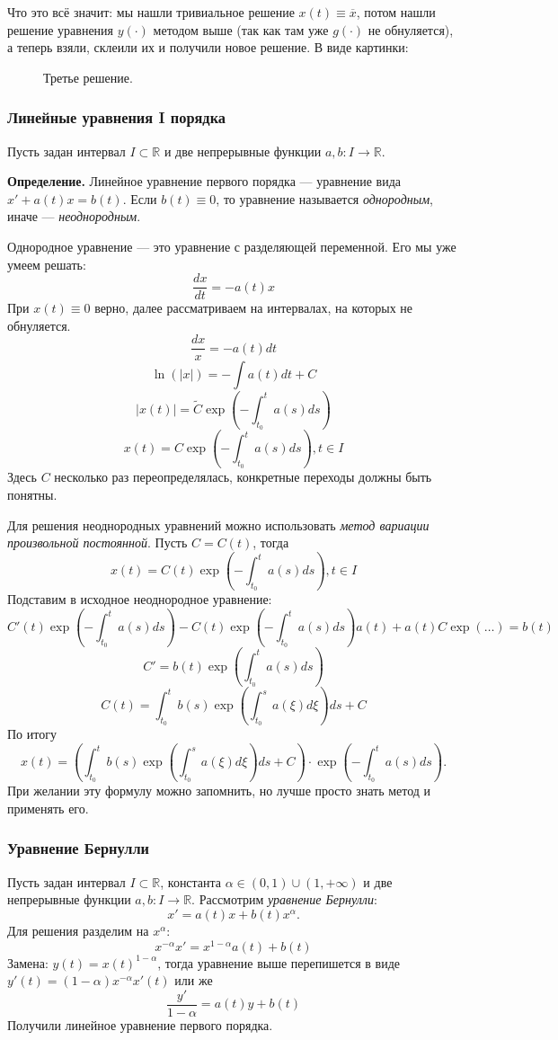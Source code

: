 Что это всё значит: мы нашли тривиальное решение $x(t) \equiv \overline x$, потом нашли решение уравнения $y(\cdot)$ методом выше (так как там уже $g(\cdot)$ не обнуляется), а теперь взяли, склеили их и получили новое решение.
В виде картинки:

\begin{figure}[ht]
    \centering
    \caption{Третье решение.}
\end{figure}

\subsubsection{Линейные уравнения I порядка}
Пусть задан интервал $I \subset \mathbb R$ и две непрерывные функции $a, b: I \to \mathbb R$.

\textbf{Определение.} Линейное уравнение первого порядка --- уравнение вида $x' + a(t)x = b(t)$.
Если $b(t) \equiv 0$, то уравнение называется \textit{однородным}, иначе --- \textit{неоднородным}.

Однородное уравнение --- это уравнение с разделяющей переменной. Его мы уже умеем решать:
\[
    \frac{dx}{dt} = -a(t)x
\]
При $x(t) \equiv 0$ верно, далее рассматриваем на интервалах, на которых не обнуляется.
\[
    \frac{dx}{x} = -a(t) dt
\]
\[
    \ln \left( |x| \right) = -\int a(t) dt + C
\]
\[
    |x(t)| = \widetilde{C} \exp \left(-\int_{t_0}^t a(s) ds \right)
\]
\[
    x(t) = C \exp \left(- \int_{t_0}^t a(s) ds \right), t \in I
\]
Здесь $C$ несколько раз переопределялась, конкретные переходы должны быть понятны.

Для решения неоднородных уравнений можно использовать \textit{метод вариации произвольной постоянной}. Пусть $C = C(t)$, тогда
\[
    x(t) = C(t) \exp \left(- \int_{t_0}^t a(s) ds \right), t \in I
\]
Подставим в исходное неоднородное уравнение:
\[
    C'(t) \exp \left(- \int_{t_0}^t a(s) ds \right) - C(t) \exp \left(- \int_{t_0}^t a(s) ds \right) a(t) + a(t) C \exp (\dots) = b(t)
\]
\[
    C' = b(t) \exp \left( \int_{t_0}^t a(s) ds \right)
\]
\[
    C(t) = \int_{t_0}^t b(s) \exp \left( \int_{t_0}^s a(\xi) d\xi \right) ds + C
\]
По итогу
\[
    x(t) = \left( \int_{t_0}^t b(s) \exp \left( \int_{t_0}^s a(\xi) d\xi \right) ds + C \right) \cdot \exp \left( - \int_{t_0}^t a(s) ds \right).
\]
При желании эту формулу можно запомнить, но лучше просто знать метод и применять его.

\subsubsection{Уравнение Бернулли}
Пусть задан интервал $I \subset \mathbb R$, константа $\alpha \in (0, 1) \cup (1, +\infty)$ и две непрерывные функции $a, b: I \to \mathbb R$.
Рассмотрим \textit{уравнение Бернулли}: 
\[
    x' = a(t) x + b(t) x^\alpha.
\]
Для решения разделим на $x^\alpha$:
\[
    x^{-\alpha} x' = x^{1 - \alpha} a(t) + b(t)
\]
Замена: $y(t) = x(t)^{1 - \alpha}$, тогда уравнение выше перепишется в виде $y'(t) = (1 - \alpha)x^{-\alpha} x'(t)$ или же
\[
    \frac{y'}{1 - \alpha} = a(t) y + b(t)
\]
Получили линейное уравнение первого порядка.

